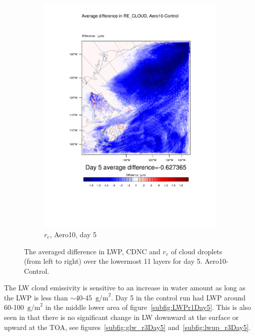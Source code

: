 \begin{figure}[hb]
\begin{subfigure}{0.48\textwidth}
		\includegraphics[width=\textwidth]{results/aero10/diff_Aero10_RE_CLOUD_Day5.pdf}
		\caption{$r_e$, Aero10, day 5}
		\label{subfig:recloud_r3Day5}
	\end{subfigure}
	\caption{The averaged difference in LWP, CDNC and $r_e$ of cloud droplets (from left to right) over the lowermost 11 layers for day 5. Aero10-Control.}
	\label{fig:lwpcdncre_r3Day5}
\end{figure}

The LW cloud emissivity is sensitive to an increase in water amount as long as the LWP is less than $\sim$40-45~$\text{g/m}^2$. Day 5 in the control run had LWP around 60-100~$\text{g/m}^2$ in the middle lower area of figure~\ref{subfig:LWPr1Day5}. %
This is also seen in that there is no significant change in LW downward at the surface or upward at the TOA, see figures~\ref{subfig:glw_r3Day5} and~\ref{subfig:lwup_r3Day5}.

